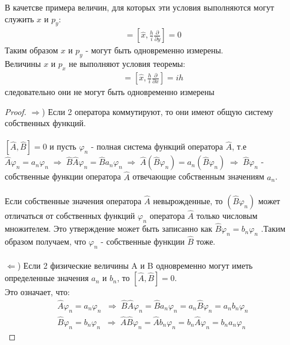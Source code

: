 В качетсве примера величин, для которых эти условия выполняются могут служить $x$ и $p_y$: 
\begin{gather*}
	[\hat{x},\hat{p_y}] = \left[\hat{x},\frac{h}{i}\frac{\partial}{\partial y}\right] = 0
\end{gather*}
Таким образом $x$ и $p_y$ - могут быть одновременно измерены.\\
Величины $x$ и $p_x$ не выполняют условия теоремы:
\begin{gather*}
[\hat{x},\hat{p_x}] = \left[\hat{x},\frac{h}{i}\frac{\partial}{\partial x}\right] = ih
\end{gather*}
следовательно они не могут быть одновременно измерены
\begin{proof}
	$\Rightarrow$) Если 2 оператора коммутируют, то они имеют общую систему собственных функций.\\\\
	$[\hat{A},\hat{B}]=0$ и пусть ${\varphi_n}$ - полная система функций оператора $\hat{A}$, т.е $\hat{A}\varphi_n = a_n\varphi_n \; \Rightarrow \; \hat{B}\hat{A}\varphi_n = \hat{B}a_n\varphi_n \; \Rightarrow \; \hat{A}(\hat{B}\varphi_n) = a_n(\hat{B}\varphi_n) \; \Rightarrow \; \hat{B}\varphi_n$ - собственные функции оператора $\hat{A}$ отвечающие собственным значениям $a_n$.  \\\\
	
	Если собственные значения оператора $\hat{A}$ невырожденные, то $(\hat{B}\varphi_n)$ может отличаться от собственных функций $\varphi_n$ оператора $\hat{A}$ только числовым множителем. Это утверждение может быть записанно как $\hat{B}\varphi_n = b_n\varphi_n$ .Таким образом получаем, что $\varphi_n$ - собственные функции $\hat{B}$ тоже.\\\\
	$\Leftarrow$) Если 2 физические величины A и B одновременно могут иметь определенные значения $a_n$ и $b_n$, то $[\hat{A},\hat{B}] = 0$.\\
	
	Это означает, что:
	\begin{gather*}
		\hat{A}\varphi_n = a_n\varphi_n \;\; \Rightarrow \; \hat{B}\hat{A}\varphi_n=\hat{B}a_n\varphi_n=a_n\hat{B}\varphi_n=a_nb_n\varphi_n\\
		\hat{B}\varphi_n = b_n\varphi_n \;\; \Rightarrow \;
		\hat{A}\hat{B}\varphi_n=\hat{A}b_n\varphi_n = b_n\hat{A}\varphi_n = b_na_n\varphi_n
	\end{gather*}
\end{proof}
